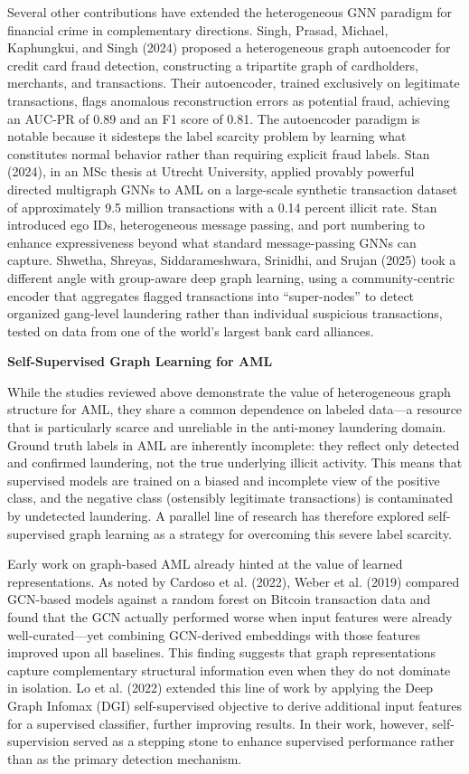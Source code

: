 \documentclass[12pt,a4paper]{article}
\begin{document}
Several other contributions have extended the heterogeneous GNN paradigm for financial crime in complementary directions. Singh, Prasad, Michael, Kaphungkui, and Singh (2024) proposed a heterogeneous graph autoencoder for credit card fraud detection, constructing a tripartite graph of cardholders, merchants, and transactions. Their autoencoder, trained exclusively on legitimate transactions, flags anomalous reconstruction errors as potential fraud, achieving an AUC-PR of 0.89 and an F1 score of 0.81. The autoencoder paradigm is notable because it sidesteps the label scarcity problem by learning what constitutes normal behavior rather than requiring explicit fraud labels. Stan (2024), in an MSc thesis at Utrecht University, applied provably powerful directed multigraph GNNs to AML on a large-scale synthetic transaction dataset of approximately 9.5 million transactions with a 0.14 percent illicit rate. Stan introduced ego IDs, heterogeneous message passing, and port numbering to enhance expressiveness beyond what standard message-passing GNNs can capture. Shwetha, Shreyas, Siddarameshwara, Srinidhi, and Srujan (2025) took a different angle with group-aware deep graph learning, using a community-centric encoder that aggregates flagged transactions into ``super-nodes'' to detect organized gang-level laundering rather than individual suspicious transactions, tested on data from one of the world's largest bank card alliances.

\bigskip
\noindent\textbf{Self-Supervised Graph Learning for AML}

\noindent While the studies reviewed above demonstrate the value of heterogeneous graph structure for AML, they share a common dependence on labeled data---a resource that is particularly scarce and unreliable in the anti-money laundering domain. Ground truth labels in AML are inherently incomplete: they reflect only detected and confirmed laundering, not the true underlying illicit activity. This means that supervised models are trained on a biased and incomplete view of the positive class, and the negative class (ostensibly legitimate transactions) is contaminated by undetected laundering. A parallel line of research has therefore explored self-supervised graph learning as a strategy for overcoming this severe label scarcity.

Early work on graph-based AML already hinted at the value of learned representations. As noted by Cardoso et al. (2022), Weber et al. (2019) compared GCN-based models against a random forest on Bitcoin transaction data and found that the GCN actually performed worse when input features were already well-curated---yet combining GCN-derived embeddings with those features improved upon all baselines. This finding suggests that graph representations capture complementary structural information even when they do not dominate in isolation. Lo et al. (2022) extended this line of work by applying the Deep Graph Infomax (DGI) self-supervised objective to derive additional input features for a supervised classifier, further improving results. In their work, however, self-supervision served as a stepping stone to enhance supervised performance rather than as the primary detection mechanism.
\end{document}
